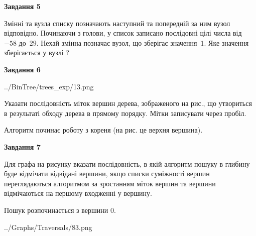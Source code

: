 \documentclass[12pt, ukrainian]{article}
\begin{document}
{\begin {large}
{\begin {center}\textbf{Завдання 5}\end {center}}\par
Змінні  та  вузла списку позначають наступний та попередній за ним вузол відповідно. Починаючи з голови, у список записано послідовні цілі числа від~$-58$ до~$29$. Нехай змінна  позначає вузол, що зберігає значення~$1$.
Яке значення зберігається у вузлі  ?\par
\newpage

{\begin {center}\textbf{Завдання 6}\end {center}}\par

\begin{center}
	{../BinTree/trees_exp/13.png}
\end{center}
Указати послідовність міток вершин дерева, зображеного на рис., що утвориться в результаті обходу дерева в прямому порядку. Мітки записувати через пробіл.\par Алгоритм починає роботу з кореня (на рис. це верхня вершина).\par
\newpage

{\begin {center}\textbf{Завдання 7}\end {center}}\par
Для графа на рисунку вказати послідовність, в якій алгоритм пошуку в глибину буде відмічати відвідані вершини, якщо списки суміжності вершин переглядаються алгоритмом за зростанням міток вершин та вершини відмічаються на першому вход\-женні у вершину.\par
Пошук розпочинається з вершини 0.\par

\begin{center}
	{../Graphs/Traversals/83.png}
\end{center}\par
\newpage


\end{large}}
\end{document}
